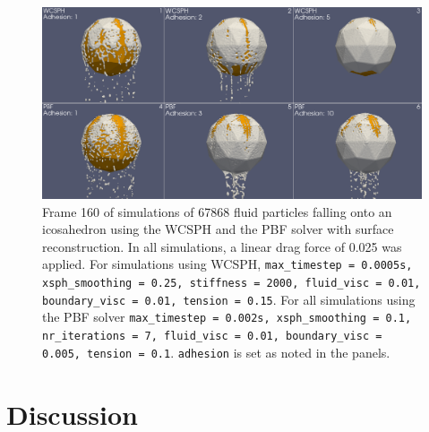 \documentclass[11pt, letterpaper, twocolumn]{article}
\begin{document}
\begin{figure}
  \centering
  \includegraphics[width=\textwidth]{images/adhesion.0160.png}
  \caption{Frame 160 of simulations of 67868 fluid particles falling onto an icosahedron using the WCSPH and the PBF solver with surface reconstruction. In all simulations, a linear drag force of 0.025 was applied. For simulations using WCSPH, \texttt{max\_timestep = 0.0005s,
  xsph\_smoothing = 0.25, stiffness = 2000, fluid\_visc = 0.01, boundary\_visc = 0.01, tension = 0.15}. For all simulations using the PBF solver \texttt{max\_timestep = 0.002s, xsph\_smoothing = 0.1, nr\_iterations = 7, fluid\_visc = 0.01, boundary\_visc = 0.005, tension = 0.1}. \texttt{adhesion} is set as noted in the panels.}
  \label{fig:adhesion}
\end{figure}

\section{Discussion}
\label{sec:discussion}
\end{document}
